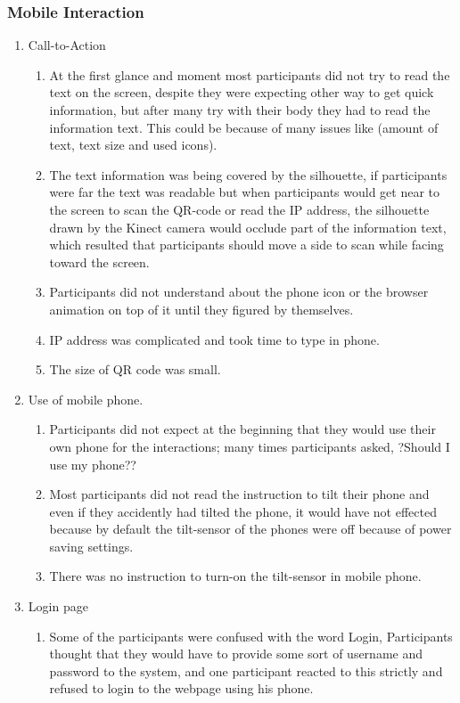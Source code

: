 \subsubsection{Mobile Interaction}
\begin{enumerate}
\item	Call-to-Action
\begin{enumerate}
\item	At the first glance and moment most participants did not try to read the text on the screen, despite they were expecting other way to get quick information, but after many try with their body they had to read the information text. This could be because of many issues like (amount of text, text size and used icons).
\item	The text information was being covered by the silhouette, if participants were far the text was readable but when participants would get near to the screen to scan the QR-code or read the IP address, the silhouette drawn by the Kinect camera would occlude part of the information text, which resulted that participants should move a side to scan while facing toward the screen.
\item	Participants did not understand about the phone icon or the browser animation on top of it until they figured by themselves.
\item	IP address was complicated and took time to type in phone.
\item	The size of QR code was small.
\end{enumerate}

\item	Use of mobile phone.
\begin{enumerate}
\item	Participants did not expect at the beginning that they would use their own phone for the interactions; many times participants asked, ?Should I use my phone?? 
\item	Most participants did not read the instruction to tilt their phone and even if they accidently had tilted the phone, it would have not effected because by default the tilt-sensor of the phones were off because of power saving settings. 
\item	There was no instruction to turn-on the tilt-sensor in mobile phone.
\end{enumerate}

\item	Login page
\begin{enumerate}
\item	Some of the participants were confused with the word Login, Participants thought that they would have to provide some sort of username and password to the system, and one participant reacted to this strictly and refused to login to the webpage using his phone.
\end{enumerate}


\end{enumerate}
